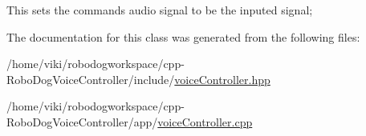 This sets the command\textquotesingle{}s audio signal to be the inputed signal;

The documentation for this class was generated from the following files\+:\begin{DoxyCompactItemize}
\item 
/home/viki/robodogworkspace/cpp-\/\+Robo\+Dog\+Voice\+Controller/include/\hyperlink{voiceController_8hpp}{voice\+Controller.\+hpp}\item 
/home/viki/robodogworkspace/cpp-\/\+Robo\+Dog\+Voice\+Controller/app/\hyperlink{voiceController_8cpp}{voice\+Controller.\+cpp}\end{DoxyCompactItemize}
